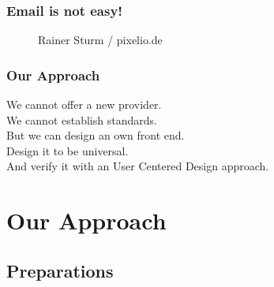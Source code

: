 \documentclass[9pt]{beamer}
\begin{document}
		\begin{frame}
			\frametitle{Email is not easy!}
			\begin{figure}
				\centering
				\caption{Rainer Sturm  / pixelio.de}
			\end{figure}
		\end{frame}
		
		\begin{frame}
			\frametitle{Our Approach}
			We cannot offer a new provider.\\
			We cannot establish standards.\\
			But we can design an own front end.\\
			Design it to be universal.\\
			And verify it with an User Centered Design approach.
		\end{frame}
	
	\section{Our Approach}
		\subsection{Preparations}
		
\end{document}
